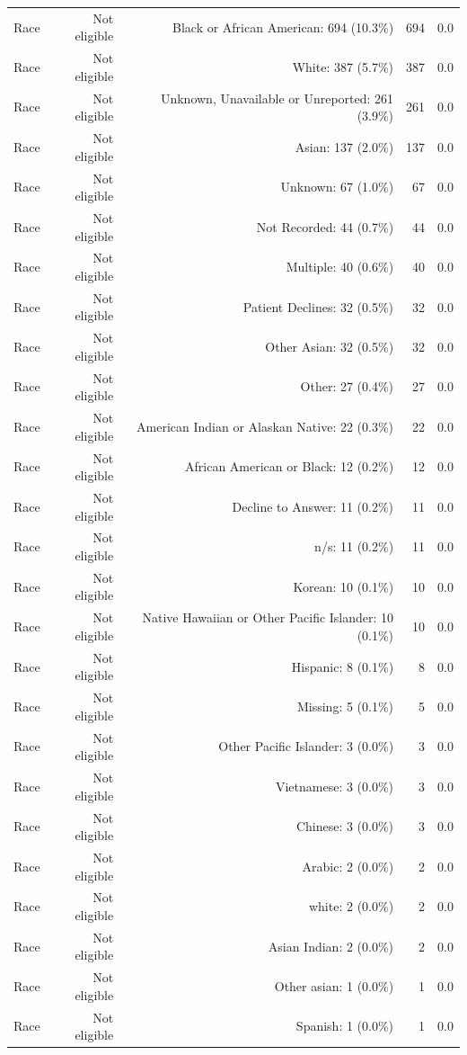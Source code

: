 \begin{table}[htbp]
\begin{tabular}{lrrrr}
Race & Not eligible & Black or African American: 694 (10.3\%) & 694 & 0.0 \\
Race & Not eligible & White: 387 (5.7\%) & 387 & 0.0 \\
Race & Not eligible & Unknown, Unavailable or Unreported: 261 (3.9\%) & 261 & 0.0 \\
Race & Not eligible & Asian: 137 (2.0\%) & 137 & 0.0 \\
Race & Not eligible & Unknown: 67 (1.0\%) & 67 & 0.0 \\
Race & Not eligible & Not Recorded: 44 (0.7\%) & 44 & 0.0 \\
Race & Not eligible & Multiple: 40 (0.6\%) & 40 & 0.0 \\
Race & Not eligible & Patient Declines: 32 (0.5\%) & 32 & 0.0 \\
Race & Not eligible & Other Asian: 32 (0.5\%) & 32 & 0.0 \\
Race & Not eligible & Other: 27 (0.4\%) & 27 & 0.0 \\
Race & Not eligible & American Indian or Alaskan Native: 22 (0.3\%) & 22 & 0.0 \\
Race & Not eligible & African American or Black: 12 (0.2\%) & 12 & 0.0 \\
Race & Not eligible & Decline to Answer: 11 (0.2\%) & 11 & 0.0 \\
Race & Not eligible & n/s: 11 (0.2\%) & 11 & 0.0 \\
Race & Not eligible & Korean: 10 (0.1\%) & 10 & 0.0 \\
Race & Not eligible & Native Hawaiian or Other Pacific Islander: 10 (0.1\%) & 10 & 0.0 \\
Race & Not eligible & Hispanic: 8 (0.1\%) & 8 & 0.0 \\
Race & Not eligible & Missing: 5 (0.1\%) & 5 & 0.0 \\
Race & Not eligible & Other Pacific Islander: 3 (0.0\%) & 3 & 0.0 \\
Race & Not eligible & Vietnamese: 3 (0.0\%) & 3 & 0.0 \\
Race & Not eligible & Chinese: 3 (0.0\%) & 3 & 0.0 \\
Race & Not eligible & Arabic: 2 (0.0\%) & 2 & 0.0 \\
Race & Not eligible & white: 2 (0.0\%) & 2 & 0.0 \\
Race & Not eligible & Asian Indian: 2 (0.0\%) & 2 & 0.0 \\
Race & Not eligible & Other asian: 1 (0.0\%) & 1 & 0.0 \\
Race & Not eligible & Spanish: 1 (0.0\%) & 1 & 0.0 \\

\end{tabular}
\end{table}
